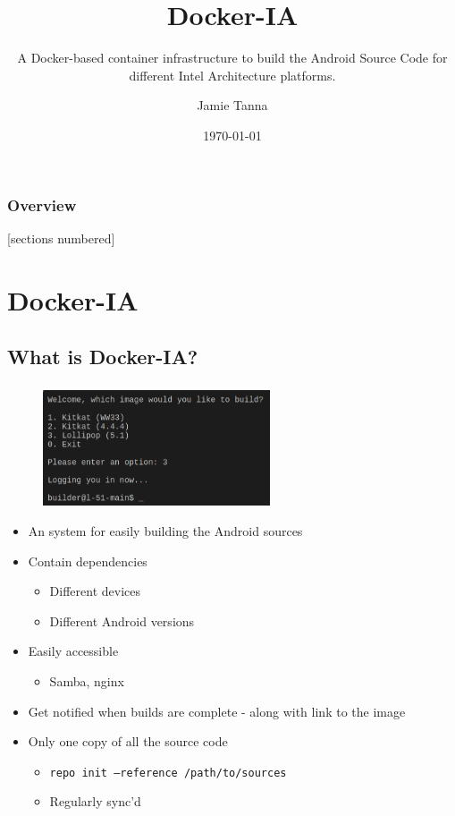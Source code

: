 \documentclass[10pt]{beamer}
\title{Docker-IA}
\subtitle{\large A Docker-based container infrastructure to build the Android Source Code for different Intel Architecture platforms.}
\date{\today}
\author{Jamie Tanna}
\makeatletter
\newcommand*{\currentname}{\@currentlabelname}
\makeatother
\begin{document}
\maketitle

\begin{frame}
	\frametitle{Overview}
	[sections numbered]
	\tableofcontents
\end{frame}

\section{Docker-IA}
\subsection{What is Docker-IA?}

\begin{frame}
	\frametitle{\currentname}

	\begin{figure}[c]
		\includegraphics[width=0.6\textwidth]{./images/projects-docker_android_ia.png}
		\\
	\end{figure}

	\begin{itemize}
		\item An system for easily building the Android sources
		\item Contain dependencies
			\begin{itemize}
				\item Different devices
				\item Different Android versions
			\end{itemize}

		\item Easily accessible
			\begin{itemize}
				\item Samba, nginx
			\end{itemize}

		\item Get notified when builds are complete - along with link to the image
		\item Only one copy of all the source code
			\begin{itemize}
				\item \texttt{repo init --reference /path/to/sources}
				\item Regularly sync'd
			\end{itemize}
	\end{itemize}
\end{frame}
\end{document}

